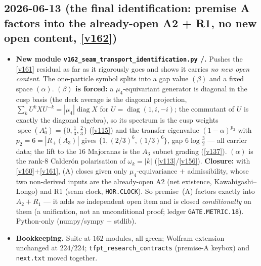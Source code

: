 \subsection*{2026-06-13 (the final identification: premise A factors into the already-open A2 + R1, no new open content, \vref{v162})}
\begin{itemize}
\item \textbf{New module \texttt{v162\_seam\_transport\_identification.py} \mE/\mO.} Pushes the \vref{v161}
  residual as far as it rigorously goes and shows it carries \emph{no new open content}. The one-particle
  symbol splits into a gap value $(\beta)$ and a fixed space $(\alpha)$. \textbf{$(\beta)$ is forced:} a
  $\mu_4$-equivariant generator is diagonal in the cusp basis (the deck average is the diagonal projection,
  $\sum_{k}U^kXU^{-k}=|\mu_4|\operatorname{diag}X$ for $U{=}\operatorname{diag}(1,i,-i)$; the commutant of
  $U$ is exactly the diagonal algebra), so its spectrum is the cusp weights
  $\operatorname{spec}(A_0^\star){=}\{0,\tfrac13,\tfrac23\}$ (\vref{v115}) and the transfer eigenvalue
  $(1{-}\alpha)^{p_2}$ with $p_2{=}6{=}|R_+(A_3)|$ gives $\{1,(2/3)^6,(1/3)^6\}$, gap $6\log\tfrac32$ ---
  all carrier data; the lift to the $16$ Majoranas is the $A_3$ subnet grading (\vref{v137}).
  \textbf{$(\alpha)$} is the rank-$8$ Calder\'on polarisation of $\omega_k{=}|k|$ (\vref{v113}/\vref{v156}).
  \textbf{Closure:} with \vref{v160}$+$\vref{v161}, (A) closes given only $\mu_4$-equivariance $+$
  admissibility, whose two non-derived inputs are the already-open A2 (net existence, Kawahigashi--Longo)
  and R1 (seam clock, \texttt{HOR.CLOCK}). So premise~(A) factors exactly into $A_2+R_1$ --- it adds
  \emph{no} independent open item and is closed \emph{conditionally} on them (a unification, not an
  unconditional proof; ledger \texttt{GATE.METRIC.18}). Python-only (numpy/sympy $+$ stdlib).
\item \textbf{Bookkeeping.} Suite at $162$ modules, all green; Wolfram extension unchanged at $224/224$;
  \texttt{tfpt\_research\_contracts} (premise-A keybox) and \texttt{next.txt} moved together.
\end{itemize}

